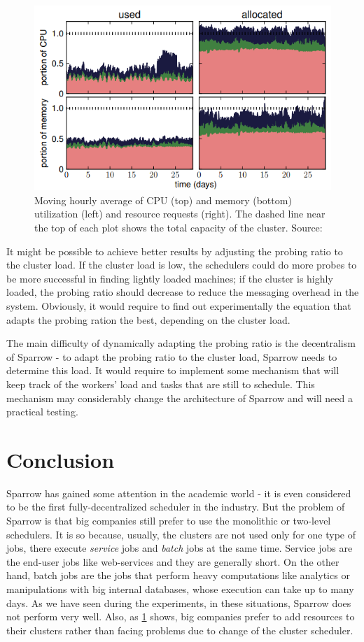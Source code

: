\documentclass[11pt]{article}
\begin{document}
		\begin{figure}
			\centering
			\includegraphics[scale=.5]{google}
			\caption{Moving hourly average of CPU (top) and memory (bottom) utilization (left) and resource requests (right). The dashed line near the top of each plot shows the total capacity of the cluster. Source: \cite{hetero}}
			\label{google}
		\end{figure}
		
		It might be possible to achieve better results by adjusting the probing ratio to the cluster load. If the cluster load is low, the schedulers could do more probes to be more successful in finding lightly loaded machines; if the cluster is highly loaded, the probing ratio should decrease to reduce the messaging overhead in the system. Obviously, it would require to find out experimentally the equation that adapts the probing ration the best, depending on the cluster load.
		
		The main difficulty of dynamically adapting the probing ratio is the decentralism of Sparrow - to adapt the probing ratio to the cluster load, Sparrow needs to determine this load. It would require to implement some mechanism that will keep track of the workers' load and tasks that are still to schedule. This mechanism may considerably change the architecture of Sparrow and will need a practical testing.
		
\section{Conclusion}

	Sparrow has gained some attention in the academic world - it is even considered to be the first fully-decentralized scheduler in the industry. But the problem of Sparrow is that big companies still prefer to use the monolithic or two-level schedulers. It is so because, usually, the clusters are not used only for one type of jobs, there execute \textit{service} jobs and \textit{batch} jobs at the same time. Service jobs are the end-user jobs like web-services and they are generally short. On the other hand, batch jobs are the jobs that perform heavy computations like analytics or manipulations with big internal databases, whose execution can take up to many days. As we have seen during the experiments, in these situations, Sparrow does not perform very well. Also, as \ref{google} shows, big companies prefer to add resources to their clusters rather than facing problems due to change of the cluster scheduler.
	
\end{document}
